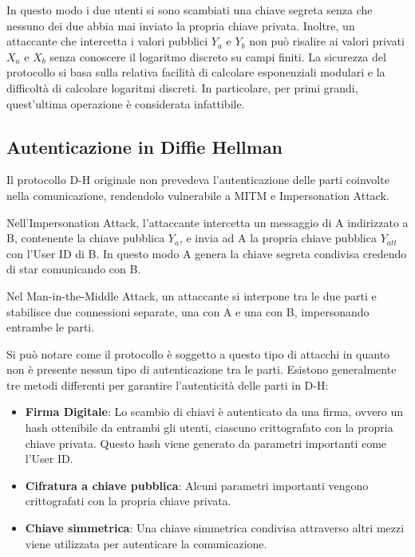 \documentclass{article}
\begin{document}
In questo modo i due utenti si sono scambiati una chiave segreta senza che nessuno dei due abbia mai inviato la propria chiave privata.
Inoltre, un attaccante che intercetta i valori pubblici $Y_a$ e $Y_b$ non può risalire ai valori privati $X_a$ e $X_b$ senza conoscere il logaritmo discreto su campi finiti.
La sicurezza del protocollo si basa sulla relativa facilità di calcolare esponenziali modulari e la difficoltà di calcolare logaritmi discreti. In particolare, per primi grandi, quest'ultima operazione è considerata infattibile.

\subsection{Autenticazione in Diffie Hellman}
Il protocollo D-H originale non prevedeva l'autenticazione delle parti coinvolte nella comunicazione, rendendolo vulnerabile a MITM e Impersonation Attack.

Nell'Impersonation Attack, l'attaccante intercetta un messaggio di A indirizzato a B, contenente la chiave pubblica $Y_a$, e invia ad A la propria chiave pubblica $Y_{att}$ con l'User ID di B.
In questo modo A genera la chiave segreta condivisa credendo di star comunicando con B.

Nel Man-in-the-Middle Attack, un attaccante si interpone tra le due parti e stabilisce due connessioni separate, una con A e una con B, impersonando entrambe le parti.

Si può notare come il protocollo è soggetto a questo tipo di attacchi in quanto non è presente nessun tipo di autenticazione tra le parti.
Esistono generalmente tre metodi differenti per garantire l'autenticità delle parti in D-H:
\begin{itemize}
	\item \textbf{Firma Digitale}: Lo scambio di chiavi è autenticato da una firma, ovvero un hash ottenibile da entrambi gli utenti, ciascuno crittografato con la propria chiave privata. Questo hash viene generato da parametri importanti come l'User ID.
	\item \textbf{Cifratura a chiave pubblica}: Alcuni parametri importanti vengono crittografati con la propria chiave privata.
	\item \textbf{Chiave simmetrica}: Una chiave simmetrica condivisa attraverso altri mezzi viene utilizzata per autenticare la comunicazione.
\end{itemize}
\end{document}
